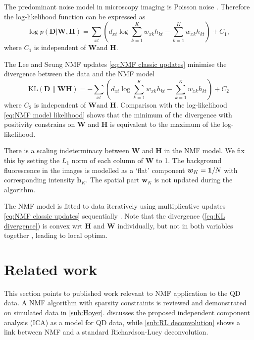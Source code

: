 The predominant noise model in microscopy imaging is Poisson noise \cite{PawleyHandbook2006}. Therefore the log-likelihood function can be expressed as
%
\begin{equation}
	\log p(\bm{D}|\bm{W},\bm{H})=\sum_{xt}\left(d_{xt}\log\sum_{k=1}^{K}w_{xk}h_{kt}-\sum_{k=1}^{K}w_{xk}h_{kt}\right)+C_{1},
	\label{eq:NMF model likelihood}
\end{equation}
%
where $C_{1}$ is independent of $\bm{W}$and $\bm{H}$. 

The Lee and Seung NMF updates \autoref{eq:NMF classic updates} minimise the divergence between the data and the NMF model
%
\begin{equation}
	\mbox{KL}(\bm{D}\parallel\bm{WH})=-\sum_{xt}\left(d_{xt}\log\sum_{k=1}^{K}w_{xk}h_{kt}-\sum_{k=1}^{K}w_{xk}h_{kt}\right)+C_{2}
	\label{eq:KL divergence}
\end{equation}
%
where $C_{2}$ is independent of $\bm{W}$and $\bm{H}$. Comparison with the log-likelihood \autoref{eq:NMF model likelihood} shows that the minimum of the divergence with positivity constrains on $\bm{W}$ and $\bm{H}$ is equivalent to the maximum of the log-likelihood. 

There is a scaling indeterminacy between $\bm{W}$ and $\bm{H}$ in the NMF model. We fix this by setting the $L_1$ norm of each column of $\bm{W}$ to 1. The background fluorescence in the images is modelled as a `flat' component $\bm{w}_{K} = \mathbf{1}/N$ with corresponding intensity $\bm{h}_{K}$. The spatial part $\bm{w}_{K}$ is not updated during the algorithm. 

The NMF model is fitted to data iteratively using multiplicative updates \autoref{eq:NMF classic updates} sequentially \cite{Lee2001}. Note that the divergence (\autoref{eq:KL divergence}) is convex wrt $\bm{H}$ and $\bm{W}$ individually, but not in both variables together \cite{Lee2001}, leading to local optima.


\clearpage
\section{Related work}
This section points to published work relevant to NMF application to the QD data. A NMF algorithm with sparsity constraints is reviewed and demonstrated on simulated data in \autoref{sub:Hoyer}.  discusses the proposed independent component analysis (ICA) as a model for QD data, while \autoref{sub:RL deconvolution} shows a link between NMF and a standard Richardson-Lucy deconvolution.

